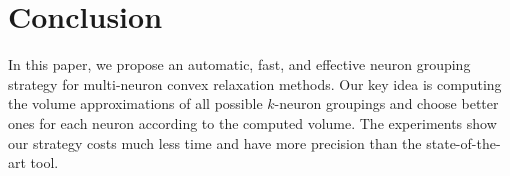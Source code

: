 \documentclass[runningheads]{llncs}
\begin{document}
\section{Conclusion}
\label{sec:conclusion}
In this paper, we propose an automatic, fast, and effective neuron grouping strategy for
multi-neuron convex relaxation methods.
Our key idea is computing the volume approximations of all possible $k$-neuron
groupings and choose better ones for each neuron according to the computed volume.
The experiments show our strategy costs much less time and have more precision than the state-of-the-art tool. 




%
%
%
\newpage




%
\end{document}
